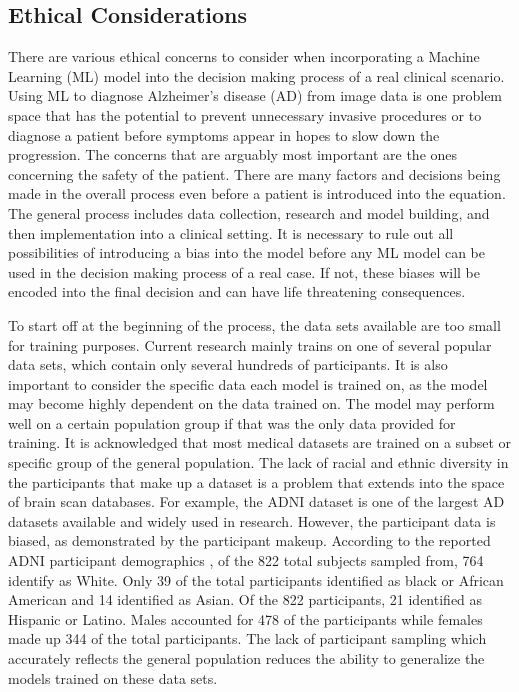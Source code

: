 \documentclass[10pt,twocolumn]{article}
\begin{document}
\subsection{Ethical Considerations}
There are various ethical concerns to consider when incorporating a Machine Learning (ML) model into the decision making process of a real clinical scenario. Using ML to diagnose Alzheimer’s disease (AD) from image data is one problem space that has the potential to prevent unnecessary invasive procedures or to diagnose a patient before symptoms appear in hopes to slow down the progression. The concerns that are arguably most important are the ones concerning the safety of the patient. There are many factors and decisions being made in the overall process even before a patient is introduced into the equation. The general process includes data collection, research and model building, and then implementation into a clinical setting. It is necessary to rule out all possibilities of introducing a bias into the model before any ML model can be used in the decision making process of a real case. If not, these biases will be encoded into the final decision and can have life threatening consequences.

To start off at the beginning of the process, the data sets available are too small for training purposes. Current research mainly trains on one of several popular data sets, which contain only several hundreds of participants. It is also important to consider the specific data each model is trained on, as the model may become highly dependent on the data trained on. The model may perform well on a certain population group if that was the only data provided for training. It is acknowledged that most medical datasets are trained on a subset or specific group of the general population. The lack of racial and ethnic diversity in the participants that make up a dataset is a problem that extends into the space of brain scan databases. For example, the ADNI dataset is one of the largest AD datasets available and widely used in research. However, the participant data is biased, as demonstrated by the participant makeup. According to the reported ADNI participant demographics \cite{adni}, of the 822 total subjects sampled from, 764 identify as White. Only 39 of the total participants identified as black or African American and 14 identified as Asian. Of the 822 participants, 21 identified as Hispanic or Latino. Males accounted for 478 of the participants while females made up 344 of the total participants. The lack of participant sampling which accurately reflects the general population reduces the ability to generalize the models trained on these data sets. 
\end{document}
